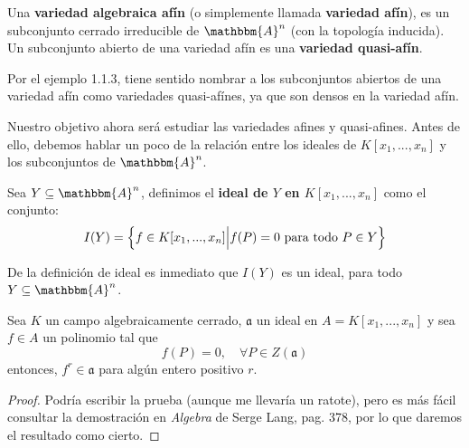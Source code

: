 \documentclass[12pt]{report}
\theoremstyle{largebreak}
\newcommand{\bbm}[1]{\ensuremath{\mathbbm{#1}}}
\newcommand{\fk}[1]{\ensuremath{\mathfrak{#1}}}
\begin{document}
    \begin{mydef}
        Una \textbf{variedad algebraica afín} (o simplemente llamada \textbf{variedad afín}), es un subconjunto cerrado irreducible de $\bbm{A}^n$ (con la topología inducida). Un subconjunto abierto de una variedad afín es una \textbf{variedad quasi-afín}.
    \end{mydef}

    Por el ejemplo 1.1.3, tiene sentido nombrar a los subconjuntos abiertos de una variedad afín como variedades quasi-afínes, ya que son densos en la variedad afín.

    Nuestro objetivo ahora será estudiar las variedades afines y quasi-afines. Antes de ello, debemos hablar un poco de la relación entre los ideales de $K[x_1,...,x_n]$ y los subconjuntos de $\bbm{A}^n$.

    \begin{mydef}
        Sea $Y\subseteq\bbm{A}^n$, definimos el \textbf{ideal de $Y$ en $K[x_1,...,x_n]$} como el conjunto:
        \begin{equation*}
            I(Y)=\left\{f\in K[x_1,...,x_n]\Big|f(P)=0\textup{ para todo }P\in Y \right\}
        \end{equation*}
    \end{mydef}

    De la definición de ideal es inmediato que $I(Y)$ es un ideal, para todo $Y\subseteq\bbm{A}^n$.

    \begin{theor}
        Sea $K$ un campo algebraicamente cerrado, $\fk{a}$ un ideal en $A=K[x_1,...,x_n]$ y sea $f\in A$ un polinomio tal que
        \begin{equation*}
            f(P)=0,\quad\forall P\in Z(\fk{a})
        \end{equation*}
        entonces, $f^r\in\fk{a}$ para algún entero positivo $r$.
    \end{theor}

    \begin{proof}
        Podría escribir la prueba (aunque me llevaría un ratote), pero es más fácil consultar la demostración en \textit{Algebra} de Serge Lang, pag. 378, por lo que daremos el resultado como cierto.
    \end{proof}
\end{document}
